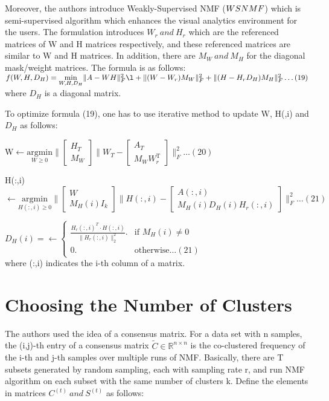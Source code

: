 \documentclass[11pt, oneside]{article}   	%
\begin{document}
Moreover, the authors introduce Weakly-Supervised NMF ($WS\-NMF$) which is semi-supervised algorithm which enhances the visual analytics environment for the users.  The formulation introduces $W_{r} \ and \ H_{r}$ which are the referenced matrices of W and H matrices respectively, and these referenced matrices are similar to W and H matrices.  In addition, there are $M_W\ and \ M_{H}$ for the diagonal mask/weight matrices.  The formula is as follows:\\
$f(W,H,D_H)=\underset{W,H,D_H}{\mathrm{min}}\|A-WH\|^{\mathrm{2}}_{F} \l+\|(W-W_r)M_W\|^{\mathrm{2}}_{F} +\|(H-H_rD_H)M_H\|^{\mathrm{2}}_{F}\ldots (19)$ where $D_H$ is a diagonal matrix.

To optimize formula (19), one has to use iterative method to update W, H(,i) and $D_H$ as follows:

W$\leftarrow \underset{W\geq0}{\mathrm{argmin}}\|[{\begin{array}{c}
H_T\\
M_W    
\end{array}}]\|W_T-[{\begin{array}{c}
A_T\\
M_WW^{\mathrm{T}}_{r}    
\end{array}}]\|^{\mathrm{2}}_{F}\ldots (20)$

H(:,i)$\leftarrow \underset{H(:,i)\geq0}{\mathrm{argmin}}\|[{\begin{array}{c}
W\\
M_{H}(i)I_{k}    
\end{array}}]\|H(:,i)-[{\begin{array}{c}
A(:,i)\\
M_{H}(i)D_{H}(i)H_{r}(:,i)    
\end{array}}]\|^{\mathrm{2}}_{F}\ldots (21)$

$D_{H}(i)=\leftarrow\begin{cases} \frac{H_{r}(:,i)^T \cdot H(:,i)}{\|H_{r}(:,i)\|^{\mathrm{2}}_{2}}.    &\text{if \(M_{H}(i)\neq0\)}\\ 0. &\text{otherwise}\ldots (21)\end{cases}$\\
where (:,i) indicates the i-th column of a matrix.

\section{Choosing the Number of Clusters}

The authors used the idea of a consensus matrix.  For a data set with n samples, the (i,j)-th entry of a consensus matrix $\tilde{C}\in\mathbb{R}^{n\times n}$ is the co-clustered frequency of the i-th and j-th samples over multiple runs of NMF.  Basically, there are T subsets generated by random sampling, each with sampling rate r, and run NMF algorithm on each subset with the same number of clusters k.  Define the elements in matrices $C^{(t)} \ and \ S^{(t)}$ as follows:\\
\end{document}

